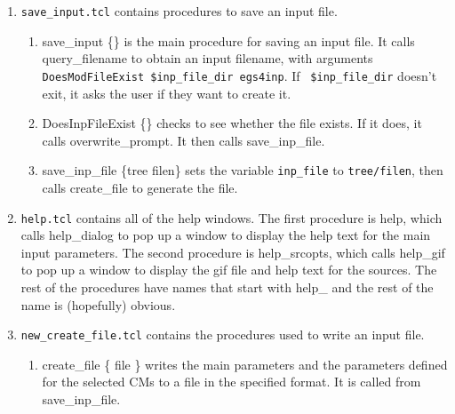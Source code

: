 \documentclass[12pt]{book}
\begin{document}
\begin{enumerate}
\item {\tt save\_input.tcl} contains procedures to save an input file.
\begin{enumerate}
\item {\sf save\_input \{\}} is the main procedure for saving an input file.  It
calls {\sf query\_filename} to obtain an input filename, with arguments
{\tt DoesModFileExist \$inp\_file\_dir egs4inp}.  If {\tt
\$inp\_file\_dir} doesn't
exit, it asks the user if they want to create it.
\item {\sf DoesInpFileExist \{\}} checks to see whether the file exists.  If
it does, it calls {\sf overwrite\_prompt}.  It then calls {\sf save\_inp\_file}.
\item {\sf save\_inp\_file \{tree filen\}} sets the variable {\tt inp\_file} to
{\tt tree/filen}, then calls {\sf create\_file} to generate the file.
\end{enumerate}

\item {\tt help.tcl} contains all of the help windows.  The first procedure is
{\sf help}, which calls {\sf help\_dialog} to pop up a window to display the help
text for the main input parameters.  The second procedure is
{\sf help\_srcopts}, which calls {\sf help\_gif} to pop up a window to
display the
gif file and help text for the sources.  The rest of the procedures have
names that start with {\sf help\_} and the rest of the name is (hopefully)
obvious.

\item {\tt new\_create\_file.tcl} contains the procedures used to write an
input file.
\begin{enumerate}
\item {\sf create\_file \{ file \}} writes the main parameters and the
parameters defined for the selected CMs to a file in the specified
format.  It is called from {\sf save\_inp\_file}.
\end{enumerate}


\end{enumerate}
\end{document}
